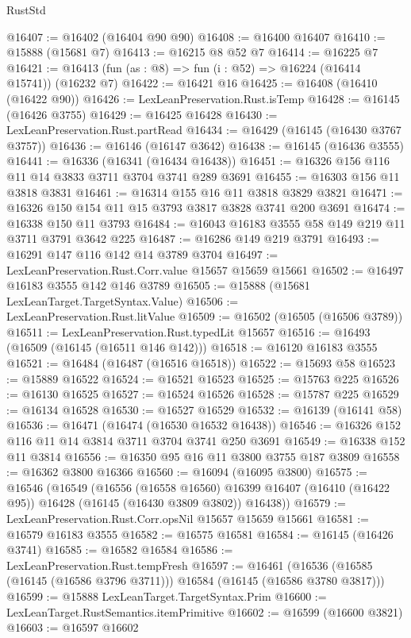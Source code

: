 \begin{lexlean}{RustStd}
\begin{coremodule}
@16407 := @16402 (@16404 @90 @90)
@16408 := @16400 @16407
@16410 := @15888 (@15681 @7)
@16413 := @16215 @8 @52 @7
@16414 := @16225 @7
@16421 := @16413 (fun (as : @8) => fun (i : @52) => @16224 (@16414 @15741)) (@16232 @7)
@16422 := @16421 @16
@16425 := @16408 (@16410 (@16422 @90))
@16426 := LexLeanPreservation.Rust.isTemp
@16428 := @16145 (@16426 @3755)
@16429 := @16425 @16428
@16430 := LexLeanPreservation.Rust.partRead
@16434 := @16429 (@16145 (@16430 @3767 @3757))
@16436 := @16146 (@16147 @3642)
@16438 := @16145 (@16436 @3555)
@16441 := @16336 (@16341 (@16434 @16438))
@16451 := @16326 @156 @116 @11 @14 @3833 @3711 @3704 @3741 @289 @3691
@16455 := @16303 @156 @11 @3818 @3831
@16461 := @16314 @155 @16 @11 @3818 @3829 @3821
@16471 := @16326 @150 @154 @11 @15 @3793 @3817 @3828 @3741 @200 @3691
@16474 := @16338 @150 @11 @3793
@16484 := @16043 @16183 @3555 @58 @149 @219 @11 @3711 @3791 @3642 @225
@16487 := @16286 @149 @219 @3791
@16493 := @16291 @147 @116 @142 @14 @3789 @3704
@16497 := LexLeanPreservation.Rust.Corr.value @15657 @15659 @15661
@16502 := @16497 @16183 @3555 @142 @146 @3789
@16505 := @15888 (@15681 LexLeanTarget.TargetSyntax.Value)
@16506 := LexLeanPreservation.Rust.litValue
@16509 := @16502 (@16505 (@16506 @3789))
@16511 := LexLeanPreservation.Rust.typedLit @15657
@16516 := @16493 (@16509 (@16145 (@16511 @146 @142)))
@16518 := @16120 @16183 @3555
@16521 := @16484 (@16487 (@16516 @16518))
@16522 := @15693 @58
@16523 := @15889 @16522
@16524 := @16521 @16523
@16525 := @15763 @225
@16526 := @16130 @16525
@16527 := @16524 @16526
@16528 := @15787 @225
@16529 := @16134 @16528
@16530 := @16527 @16529
@16532 := @16139 (@16141 @58)
@16536 := @16471 (@16474 (@16530 @16532 @16438))
@16546 := @16326 @152 @116 @11 @14 @3814 @3711 @3704 @3741 @250 @3691
@16549 := @16338 @152 @11 @3814
@16556 := @16350 @95 @16 @11 @3800 @3755 @187 @3809
@16558 := @16362 @3800 @16366
@16560 := @16094 (@16095 @3800)
@16575 := @16546
    (@16549
      (@16556
        (@16558 @16560)
        @16399
        @16407
        (@16410 (@16422 @95))
        @16428
        (@16145 (@16430 @3809 @3802))
        @16438))
@16579 := LexLeanPreservation.Rust.Corr.opsNil @15657 @15659 @15661
@16581 := @16579 @16183 @3555
@16582 := @16575 @16581
@16584 := @16145 (@16426 @3741)
@16585 := @16582 @16584
@16586 := LexLeanPreservation.Rust.tempFresh
@16597 := @16461
    (@16536 (@16585 (@16145 (@16586 @3796 @3711))) @16584 (@16145 (@16586 @3780 @3817)))
@16599 := @15888 LexLeanTarget.TargetSyntax.Prim
@16600 := LexLeanTarget.RustSemantics.itemPrimitive
@16602 := @16599 (@16600 @3821)
@16603 := @16597 @16602

\end{coremodule}
\end{lexlean}
